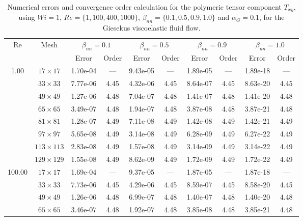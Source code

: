 \documentclass[preprint, 12pt]{elsarticle}
\begin{document}
\begin{center}
\begin{table}[H]
\caption{Numerical errors and convergence order calculation for the polymeric tensor component $T_{xy}$, using \mbox{$Wi=1$}, $Re=\{1,100,400,1000\}$, $\beta_{nn}=\{0.1,0.5,0.9,1.0\}$ and \mbox{$\alpha_G = 0.1$}, for the Giesekus viscoelastic fluid flow.\label{tab_GiesekusTxyalphaG01Resumida}}
\scriptsize{
    \begin{tabular*}{\textwidth}{@{\extracolsep\fill}cccccccccc@{}}
    \hline
    \multirow{2}{*}{$\operatorname{Re}$} & \multirow{2}{*}{Mesh} & \multicolumn{2}{c}{$\beta_{nn}=0.1$}  & \multicolumn{2}{c}{$\beta_{nn}=0.5$}  & \multicolumn{2}{c}{$\beta_{nn}=0.9$}  & \multicolumn{2}{c}{$\beta_{nn}=1.0$}\\ %
     & & Error & Order & Error & Order & Error & Order & Error & Order \\
    \hline
    \multirow{7}{*}{1.00} & $17\times 17$ & 1.70e-04 & --- & 9.43e-05 & --- & 1.89e-05 & --- & 1.89e-18 & --- \\
    & $33\times 33$ & 7.77e-06 & 4.45 & 4.32e-06 & 4.45 & 8.64e-07 & 4.45 & 8.63e-20 & 4.45 \\
    & $49\times 49$ & 1.27e-06 & 4.48 & 7.04e-07 & 4.48 & 1.41e-07 & 4.48 & 1.41e-20 & 4.48 \\
    & $65\times 65$ & 3.49e-07 & 4.48 & 1.94e-07 & 4.48 & 3.87e-08 & 4.48 & 3.87e-21 & 4.48 \\
    & $81\times 81$ & 1.28e-07 & 4.49 & 7.11e-08 & 4.49 & 1.42e-08 & 4.49 & 1.42e-21 & 4.49 \\
    & $97\times 97$ & 5.65e-08 & 4.49 & 3.14e-08 & 4.49 & 6.28e-09 & 4.49 & 6.27e-22 & 4.49 \\
    & $113\times 113$ & 2.83e-08 & 4.49 & 1.57e-08 & 4.49 & 3.14e-09 & 4.49 & 3.14e-22 & 4.49 \\
    & $129\times 129$ & 1.55e-08 & 4.49 & 8.62e-09 & 4.49 & 1.72e-09 & 4.49 & 1.72e-22 & 4.49 \\
    \hline
    \multirow{7}{*}{100.00} & $17\times 17$ & 1.69e-04 & --- & 9.37e-05 & --- & 1.87e-05 & --- & 1.87e-18 & --- \\
    & $33\times 33$ & 7.73e-06 & 4.45 & 4.29e-06 & 4.45 & 8.59e-07 & 4.45 & 8.58e-20 & 4.45 \\
    & $49\times 49$ & 1.26e-06 & 4.48 & 6.99e-07 & 4.48 & 1.40e-07 & 4.48 & 1.40e-20 & 4.48 \\
    & $65\times 65$ & 3.46e-07 & 4.48 & 1.92e-07 & 4.48 & 3.85e-08 & 4.48 & 3.85e-21 & 4.48 \\

\end{tabular*}}
\end{table}
\end{center}
\end{document}
